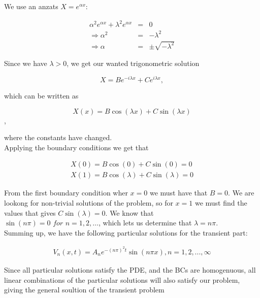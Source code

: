 \documentclass{article}
\begin{document}
We use an anzats $X=e^{\alpha x}$:

\begin{subequations}
	\begin{eqnarray}
	\alpha^2 e^{\alpha x} + \lambda^2 e^{\alpha x} &=& 0 \\ 
	\Rightarrow \alpha^2 &=& -\lambda^2 \\ 
	\Rightarrow \alpha &=& \pm \sqrt{-\lambda^2}
	\end{eqnarray}
\end{subequations}

Since we have $\lambda > 0$, we get our wanted trigonometric solution

\begin{equation}
X = Be^{-i\lambda x} + Ce^{i\lambda x},
\label{eqn:xDependenttransientTerm1D}
\end{equation}

which can be written as

\begin{equation}
X(x) = B\cos(\lambda x) + C\sin(\lambda x) 
\end{equation},

where the constants have changed.\\

Applying the boundary conditions we get that

\begin{eqnarray}
X(0) = B\cos(0) + C\sin(0) = 0 \\ 
X(1) = B\cos(\lambda) + C\sin(\lambda) = 0
\end{eqnarray}

From the first boundary condition wher $x=0$ we must have that $B=0$. We are lookong for non-trivial solutions of the problem, so for $x=1$ we must find the  values that gives $C\sin(\lambda)=0$. We know that\\ $\sin(n \pi) =0 \textit{ for } n = 1,2, \ldots $, which lets us determine that $\lambda = n \pi$.\\

Summing up, we have the following particular solutions for the transient part:

\begin{subequations}
	\begin{eqnarray}
	V_n(x,t) = A_ne^{-(n\pi)^2 t}\sin(n \pi x), n=1,2,...,\infty
	\end{eqnarray}
\end{subequations}

Since all particular solutions satisfy the PDE, and the BCs are homogenuous, all linear combinations of the particular solutions will also satisfy our problem, giving the general soultion of the transient problem
\end{document}
